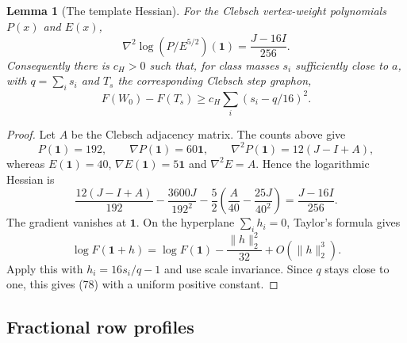 \documentclass[11pt]{amsart}
\newtheorem{lemma}[theorem]{Lemma}
\theoremstyle{definition}
\theoremstyle{remark}
\begin{document}
\begin{lemma}[The template Hessian]\label{lem:template-hessian}
For the Clebsch vertex-weight polynomials $P(x)$ and $E(x)$,
\[
 \nabla^2\log(P/E^{5/2})(\mathbf1)=\frac{J-16I}{256}.
\]
Consequently there is $c_H>0$ such that, for class masses $s_i$
sufficiently close to $a$, with $q=\sum_i s_i$ and $T_s$ the
corresponding Clebsch step graphon,
\begin{equation}\tag{78}\label{eq:hessian-defect}
 F(W_0)-F(T_s)\geq c_H\sum_i(s_i-q/16)^2.
\end{equation}
\end{lemma}
\begin{proof}
Let $A$ be the Clebsch adjacency matrix. The counts above give
\[
 P(\mathbf1)=192,\qquad\nabla P(\mathbf1)=60\mathbf1,\qquad
 \nabla^2P(\mathbf1)=12(J-I+A),
\]
whereas $E(\mathbf1)=40$, $\nabla E(\mathbf1)=5\mathbf1$ and
$\nabla^2E=A$. Hence the logarithmic Hessian is
\[
 \frac{12(J-I+A)}{192}-\frac{3600J}{192^2}
 -\frac52\left(\frac A{40}-\frac{25J}{40^2}\right)
 =\frac{J-16I}{256}.
\]
The gradient vanishes at $\mathbf1$. On the hyperplane $\sum_i h_i=0$,
Taylor's formula gives
\[
 \log F(\mathbf1+h)
 =\log F(\mathbf1)-\frac{\lVert h\rVert_2^2}{32}
     +O(\lVert h\rVert_2^3).
\]
Apply this with $h_i=16s_i/q-1$ and use scale invariance. Since $q$
stays close to one, this gives (78) with a uniform positive constant.
\end{proof}

\subsection{Fractional row profiles}
\end{document}
